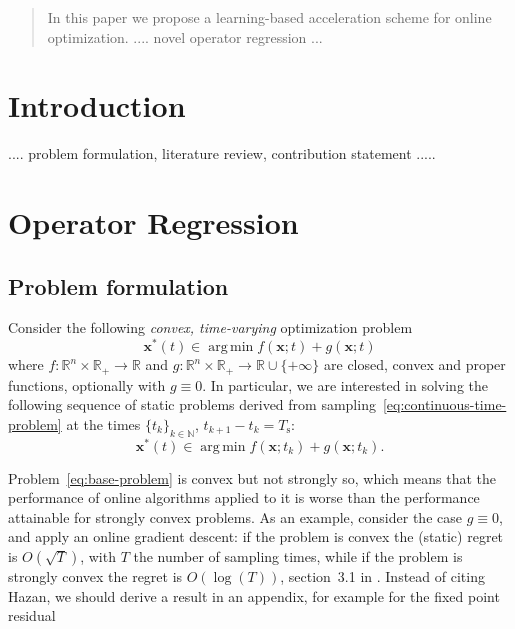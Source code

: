 \documentclass{article}
\DeclareMathOperator*{\argmin}{arg\,min}
\newcommand{\N}{\mathbb{N}}
\newcommand{\R}{\mathbb{R}}
\newcommand{\x}{\mathbold{x}}
\newcommand{\Ts}{T_\mathrm{s}}
\newcommand{\nicola}[1]{{\color{blue}#1}}
\begin{document}
\printAffiliationsAndNotice{}  %

\begin{abstract}
In this paper we propose a learning-based acceleration scheme for online optimization. .... novel operator regression ...
\end{abstract}


\section{Introduction}\label{sec:introduction}

.... problem formulation, literature review, contribution statement .....


\section{Operator Regression}\label{sec:opreg}

\subsection{Problem formulation}
Consider the following \emph{convex, time-varying} optimization problem
\begin{equation}\label{eq:continuous-time-problem}
	\x^*(t) \in \argmin f(\x; t) + g(\x; t)
\end{equation}
where $f : \R^n \times \R_+ \to \R$ and $g : \R^n \times \R_+ \to \R \cup \{ +\infty \}$ are closed, convex and proper functions, optionally with $g \equiv 0$. In particular, we are interested in solving the following sequence of static problems derived from sampling~\eqref{eq:continuous-time-problem} at the times $\{ t_k \}_{k \in \N}$, $t_{k+1} - t_k = \Ts$:
\begin{equation}\label{eq:base-problem}
	\x^*(t) \in \argmin f(\x; t_k) + g(\x; t_k).
\end{equation}

Problem~\eqref{eq:base-problem} is convex but not strongly so, which means that the performance of online algorithms applied to it is worse than the performance attainable for strongly convex problems. As an example, consider the case $g \equiv 0$, and apply an online gradient descent: if the problem is convex the (static) regret is $O(\sqrt{T})$, with $T$ the number of sampling times, while if the problem is strongly convex the regret is $O(\log(T))$, section~3.1 in \cite{hazan_introduction_2016}. \nicola{Instead of citing Hazan, we should derive a result in an appendix, for example for the fixed point residual}
\end{document}
